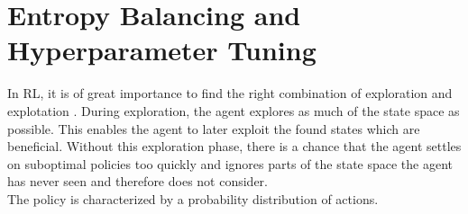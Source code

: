 \section{Entropy Balancing and Hyperparameter Tuning}\label{entropy_balancing_hyperparameter}
In RL, it is of great importance to find the right combination of exploration and explotation \cite{explorationexploitation}. During exploration, the agent explores as much of the state space as possible. This enables the agent to later exploit the found states which are beneficial. Without this exploration phase, there is a chance that the agent settles on suboptimal policies too quickly and ignores parts of the state space the agent has never seen and therefore does not consider.\\
The policy is characterized by a probability distribution of actions.

